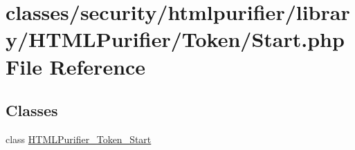 \hypertarget{Start_8php}{\section{classes/security/htmlpurifier/library/\+H\+T\+M\+L\+Purifier/\+Token/\+Start.php File Reference}
\label{Start_8php}
}
\subsection*{Classes}
\begin{DoxyCompactItemize}
\item 
class \hyperlink{classHTMLPurifier__Token__Start}{H\+T\+M\+L\+Purifier\+\_\+\+Token\+\_\+\+Start}
\end{DoxyCompactItemize}
